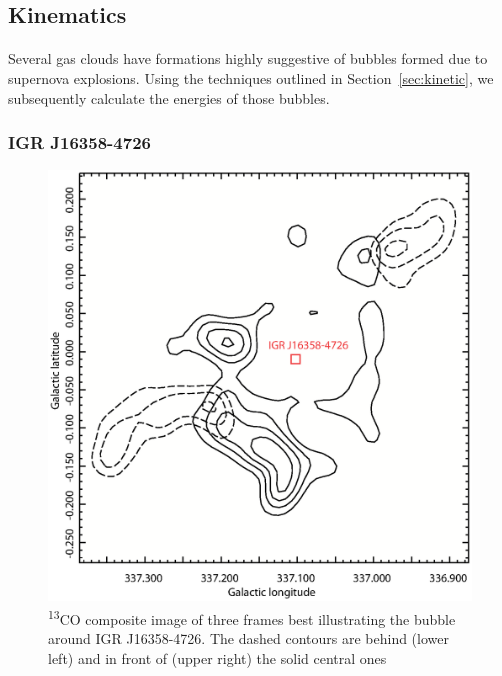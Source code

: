 \documentclass[a4paper, titlepage, oneside]{article}
\newcommand{\elem}[2]{\textsuperscript{#1}{#2}}
\begin{document}
\begin{multicols}{2}
\subsection{Kinematics}
\paragraph{}
Several gas clouds have formations highly suggestive of bubbles formed due to supernova explosions. Using the techniques outlined in Section~\ref{sec:kinetic}, we subsequently calculate the energies of those bubbles.

\subsubsection{IGR J16358-4726}

\begin{figure}[H]
  \centering
  \includegraphics[width = \columnwidth]{figures/bubble34}
  \caption{\elem{13}{C}O composite image of three frames best illustrating the bubble around IGR J16358-4726. The dashed contours are behind (lower left) and in front of (upper right) the solid central ones}
  \label{fig:bubble34}
\end{figure}


\end{multicols}
\end{document}
